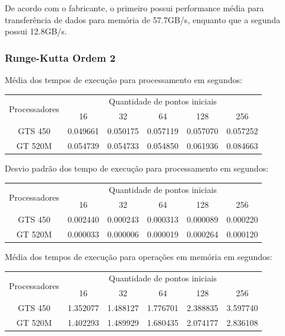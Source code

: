   De acordo com o fabricante, o primeiro possui performance média para transferência de dados para memória de 57.7GB/s, enquanto que a segunda possui 12.8GB/s.
    \subsubsection{Runge-Kutta Ordem 2}
    Média dos tempos de execução para processamento em segundos:\\
    \begin{tabular}{| c | c | c | c | c | c |}
      \hline
      \multirow{2}{*}{Processadores}& \multicolumn{5}{|c|}{Quantidade de pontos iniciais} \\ \cline{2-6}
      & 16 & 32 & 64 & 128 & 256 \\ \hline
      GTS 450 & 0.049661 & 0.050175 & 0.057119 & 0.057070 & 0.057252 \\ \hline
      GT 520M & 0.054739 & 0.054733 & 0.054850 & 0.061936 & 0.084663 \\ \hline

      \hline
    \end{tabular}
    
    \hspace{1mm}\newline
    
    \noindent Desvio padrão dos tempo de execução para processamento em segundos:\\
    \begin{tabular}{| c | c | c | c | c | c |}
      \hline
      \multirow{2}{*}{Processadores}& \multicolumn{5}{|c|}{Quantidade de pontos iniciais} \\ \cline{2-6}
      & 16 & 32 & 64 & 128 & 256 \\ \hline
      GTS 450 & 0.002440 & 0.000243 & 0.000313 & 0.000089 & 0.000220 \\ \hline
      GT 520M & 0.000033 & 0.000006 & 0.000019 & 0.000264 & 0.000120 \\ \hline

      \hline
    \end{tabular}
    
    \hspace{1mm}\newline
    
    \noindent Média dos tempos de execução para operações em memória em segundos:\\
    \begin{tabular}{| c | c | c | c | c | c |}
      \hline
      \multirow{2}{*}{Processadores}& \multicolumn{5}{|c|}{Quantidade de pontos iniciais} \\ \cline{2-6}
      & 16 & 32 & 64 & 128 & 256 \\ \hline
      GTS 450 & 1.352077 & 1.488127 & 1.776701 & 2.388835 & 3.597740 \\ \hline
      GT 520M & 1.402293 & 1.489929 & 1.680435 & 2.074177 & 2.836108\\ \hline

      \hline
    \end{tabular}
    
